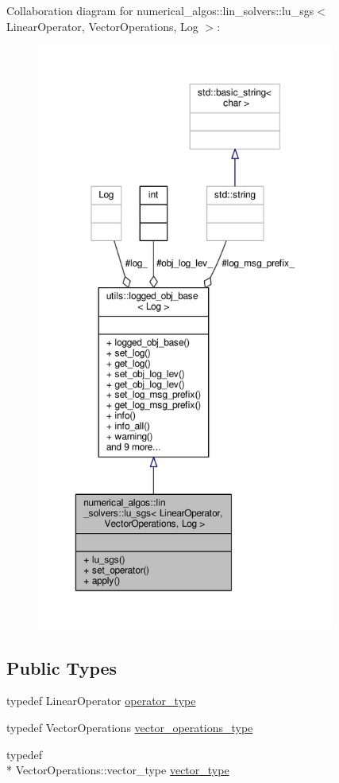 Collaboration diagram for numerical\-\_\-algos\-:\-:lin\-\_\-solvers\-:\-:lu\-\_\-sgs$<$ Linear\-Operator, Vector\-Operations, Log $>$\-:
\nopagebreak
\begin{figure}[H]
\begin{center}
\leavevmode
\includegraphics[height=550pt]{classnumerical__algos_1_1lin__solvers_1_1lu__sgs__coll__graph}
\end{center}
\end{figure}
\subsection*{Public Types}
\begin{DoxyCompactItemize}
\item 
typedef Linear\-Operator \hyperlink{classnumerical__algos_1_1lin__solvers_1_1lu__sgs_aa14a4c02a91393066a7582cb5e138e2c}{operator\-\_\-type}
\item 
typedef Vector\-Operations \hyperlink{classnumerical__algos_1_1lin__solvers_1_1lu__sgs_ac92691bd7442a226c10fab88f4f5fd0d}{vector\-\_\-operations\-\_\-type}
\item 
typedef \\*
Vector\-Operations\-::vector\-\_\-type \hyperlink{classnumerical__algos_1_1lin__solvers_1_1lu__sgs_ac04dfa258dce932c55628e33aa5cf09e}{vector\-\_\-type}
\end{DoxyCompactItemize}
